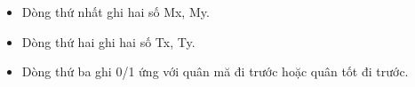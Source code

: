 \begin{itemize}
	\item     Dòng thứ nhất ghi hai số Mx, My.   
	\item     Dòng thứ hai ghi hai số Tx, Ty.   
	\item     Dòng thứ ba ghi 0/1 ứng với quân mă đi trước hoặc quân tốt đi trước.   
\end{itemize}